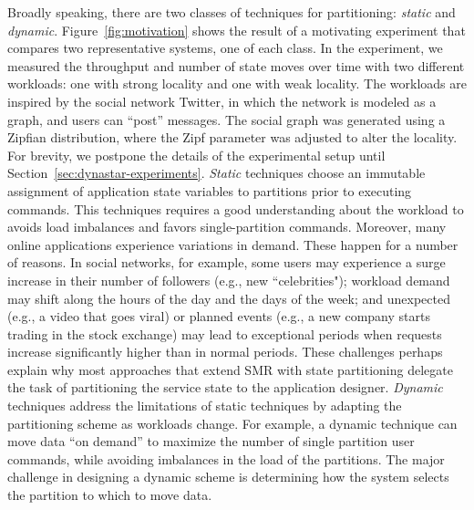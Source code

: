 Broadly speaking, there are two classes of techniques for partitioning:
\emph{static} and \emph{dynamic}. Figure~\ref{fig:motivation} shows the result
of a motivating experiment that compares two representative systems, one of each
class. In the experiment, we measured the throughput and number of state moves
over time with two different workloads: one with strong locality and one with
weak locality. The workloads are inspired by the social network Twitter, in
which the network is modeled as a graph, and users can ``post'' messages. The
social graph was generated using a Zipfian distribution, where the Zipf
parameter was adjusted to alter the locality.  For brevity, we postpone the
details of the experimental setup until Section~\ref{sec:dynastar-experiments}.
\emph{Static} techniques choose an immutable assignment of application state
variables to partitions prior to executing commands. This techniques requires a
good understanding about the workload to avoids load imbalances and favors
single-partition commands.  Moreover, many online applications experience
variations in demand. These happen for a number of reasons. In social networks,
for example, some users may experience a surge increase in their number of
followers (e.g., new ``celebrities"); workload demand may shift along the hours
of the day and the days of the week; and unexpected (e.g., a video that goes
viral) or planned events (e.g., a new company starts trading in the stock
exchange) may lead to exceptional periods when requests increase significantly
higher than in normal periods. These challenges perhaps explain why most
approaches that extend SMR with state partitioning delegate the task of
partitioning the service state to the application designer. \emph{Dynamic}
techniques address the limitations of static techniques by adapting the
partitioning scheme as workloads change. For example, a dynamic technique can
move data ``on demand'' to maximize the number of single partition user
commands, while avoiding imbalances in the load of the partitions. The major
challenge in designing a dynamic scheme is determining how the system selects
the partition to which to move data.


